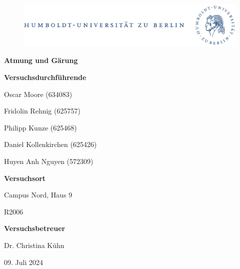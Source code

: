 \documentclass[10pt,a4paper]{article}
\begin{document}
	
	\begin{titlepage}
		\begin{center}
			\begin{figure}[h!tbp]
				\includegraphics[width=\linewidth]{HUlogo.PNG}
			\end{figure}
			\vspace*{2 cm}
			
			\textcolor{Bluetitle}{\textbf{\huge Atmung und Gärung}}\par
			
			\vspace*{2cm}
			
			\textcolor{Greyish}{\textbf{Versuchsdurchführende}}\par
			\textcolor{Greyish}{Oscar Moore (634083)}\par
			\textcolor{Greyish}{Fridolin Rehnig (625757)}\par
			\textcolor{Greyish}{Philipp Kunze (625468)}\par
			\textcolor{Greyish}{Daniel Kollenkirchen (625426)}\par
			\textcolor{Greyish}{Huyen Anh Nguyen (572309)}\par
			
			\vspace*{0.5cm}
			\textcolor{Greyish}{\textbf{Versuchsort}}\par
			\textcolor{Greyish}{Campus Nord, Haus 9}\par
			\textcolor{Greyish}{R2006}\par
			\vspace*{0.5cm}
			\textcolor{Greyish}{\textbf{Versuchsbetreuer}}\par
			\textcolor{Greyish}{Dr. Christina Kühn}\par
			
			\vspace*{2 cm}
			
			\textcolor{Greyish}{09. Juli 2024}\par
			
			
			
			
		\end{center}
	\end{titlepage}
	
	\tableofcontents
	
\end{document}
